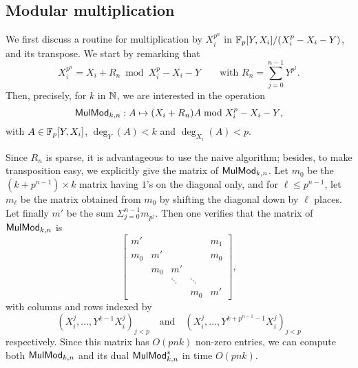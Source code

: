
\subsection{Modular multiplication}
\label{ssec:mulmod}

We first discuss a routine for multiplication by $X_i^{p^n}$
in $\mathbb{F}_p[Y,X_i]/(X_i^p-X_i-Y)$, and its transpose. We start by
remarking that 
\begin{equation}
  \label{eq:Kn}
  X_i^{p^n}=X_i+R_n \bmod X_i^p-X_i-Y \qquad\text{with }
  R_n = \sum_{j=0}^{n-1} Y^{p^j}
  \text{.}
\end{equation}
Then, precisely, for $k$ in $\mathbb{N}$, we are interested in the operation
\begin{equation}
  \label{eq:89}
  {\sf MulMod}_{k,n}: A \mapsto (X_i+R_n)A \bmod X_i^p-X_i-Y
  \text{,}  
\end{equation}
with $A\in \mathbb{F}_p[Y,X_i]$, $\deg_Y(A) < k$ and $\deg_{X_i}(A) <p$.

Since $R_n$ is sparse, it is advantageous to use the naive algorithm;
besides, to make transposition easy, we explicitly give the matrix of
${\sf MulMod}_{k,n}$. Let $m_0$ be the $(k+p^{n-1})\times k$ matrix
having $1$'s on the diagonal only, and for $\ell \le p^{n-1}$, let
$m_\ell$ be the matrix obtained from $m_0$ by shifting the diagonal
down by $\ell$ places. Let finally $m'$ be the sum $\Sigma_{j=0}^{n-1}
m_{p^j}$. Then one verifies that the matrix of ${\sf MulMod}_{k,n}$
is $$\left [
\begin{matrix}
m'  &     &        &        & m_1 \\
m_0 & m'  &        &        & m_0 \\
    & m_0 & m'     &        &     \\
    &     & \ddots & \ddots &     \\
    &     &        & m_0    & m'
\end{matrix}
\right ],$$ 
with columns and rows indexed by 
\begin{equation}
  \label{eq:90}
  (X_i^j,\dots,Y^{k-1}X_i^j)_{j < p}
  \quad\text{and}\quad
  (X_i^j,\dots,Y^{k+p^{n-1}-1}X_i^j)_{j < p}  
\end{equation}
respectively.  Since this matrix
has $O(pnk)$ non-zero entries,  we can compute both 
${\sf MulMod}_{k,n}$ and its dual ${\sf MulMod}_{k,n}^\ast$ in time $O(pnk)$.




